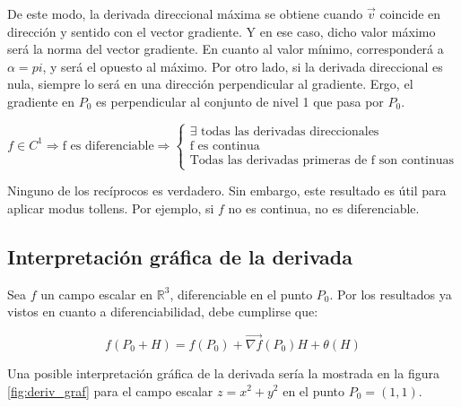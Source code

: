 \documentclass{article}
\renewcommand{\Bbb}{\mathbb}
\begin{document}
De este modo, la derivada direccional máxima se obtiene cuando $\overrightarrow{v}$ coincide en dirección y sentido con el vector gradiente. Y en ese caso, dicho valor máximo será la norma del vector gradiente. En cuanto al valor mínimo, corresponderá a $\alpha=pi$, y será el opuesto al máximo. Por otro lado, si la derivada direccional es nula, siempre lo será en una dirección perpendicular al gradiente. Ergo, el gradiente en $P_0$ es perpendicular al conjunto de nivel 1 que pasa por $P_0$.

\begin{equation}
f \in C^1 \Rightarrow \text{f es diferenciable} \Rightarrow \left\{
\begin{array}{ll}
\exists \text{ todas las derivadas direccionales} \\
\text{f es continua} \\
\text{Todas las derivadas primeras de f son continuas}
\end{array}
\right.
\end{equation}

Ninguno de los recíprocos es verdadero. Sin embargo, este resultado es útil para aplicar modus tollens. Por ejemplo, si $f$ no es continua, no es diferenciable.

\subsection{Interpretación gráfica de la derivada}

Sea $f$ un campo escalar en $\Bbb R^3$, diferenciable en el punto $P_0$. Por los resultados ya vistos en cuanto a diferenciabilidad, debe cumplirse que:

\begin{equation}
f(P_0 + H) = f(P_0) + \overrightarrow{\nabla{f}}(P_0) H + \theta(H)
\end{equation}

Una posible interpretación gráfica de la derivada sería la mostrada en la figura \ref{fig:deriv_graf} para el campo escalar $z = x^2 + y^2$ en el punto $P_0 = (1,1)$.
 
\end{document}

